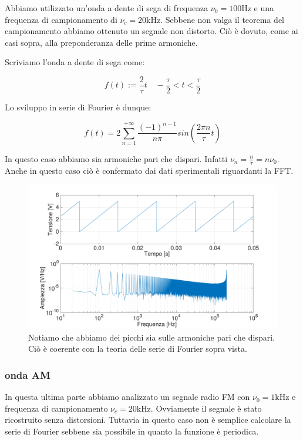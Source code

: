 Abbiamo utilizzato un'onda a dente di sega di frequenza $\nu_0=100 \si{\hertz}$ e una frequenza di campionamento di $\nu_c=20\si{\kilo\hertz}$. Sebbene non valga il teorema del campionamento abbiamo ottenuto un segnale non distorto. Ciò è dovuto, come ai casi sopra, alla preponderanza delle prime armoniche.

Scriviamo l'onda a dente di sega come: 

$$f(t):= \frac{2}{\tau}t \quad -\frac{\tau}{2}<t<\frac{\tau}{2}$$

Lo sviluppo in serie di Fourier è dunque:

\begin{equation}
f(t)=2\sum_{n=1}^{+\infty}\frac{(-1)^{n-1}}{n\pi}sin (\frac{2\pi n}{\tau}t)
\end{equation}


In questo caso abbiamo sia armoniche pari che dispari. Infatti $\nu_n=\frac{n}{\tau}=n\nu_0$. Anche in questo caso ciò è confermato dai dati sperimentali riguardanti la FFT. 

\begin{figure}[H]
\centering
	\includegraphics[width=.73\textwidth]{../E13/latex/sega100hz@10000,200000.pdf}
	\caption{Notiamo che abbiamo dei picchi sia sulle armoniche pari che dispari. Ciò è coerente con la teoria delle serie di Fourier sopra vista.}
	\label{sega}
\end{figure}

\subsubsection{onda AM}

In questa ultima parte abbiamo analizzato un segnale radio FM con $\nu_0=1\si{\kilo\hertz}$ e frequenza di campionamento $\nu_c=20\si{\kilo\hertz}$. Ovviamente il segnale è stato ricostruito senza distorsioni. Tuttavia in questo caso non è semplice calcolare la serie di Fourier sebbene sia possibile in quanto la funzione è periodica. 

